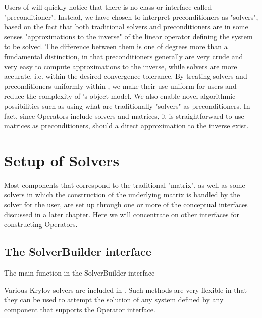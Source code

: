 
Users of \hypre{} will quickly notice that there is
no class or interface called 
"preconditioner". Instead, we have chosen to interpret preconditioners as
"solvers", based on the fact that 
both traditional solvers and preconditioners are in some senses "approximations
to the inverse" of the linear 
operator defining the system to be solved. The difference between them is one
of degrees more than a fundamental distinction, in that 
preconditioners generally are very crude and very easy to compute
approximations to the inverse, while 
solvers are more accurate, i.e. within the desired convergence tolerance. By
treating solvers and 
preconditioners uniformly within \hypre{}, we make their use uniform for users and
reduce the complexity 
of \hypre{}'s object model. We also enable novel algorithmic possibilities such as
using what are 
traditionally "solvers" as preconditioners. In fact, since Operators include
solvers and matrices, it is 
straightforward to use matrices as preconditioners, should a direct
approximation to the inverse exist. 

\section{Setup of Solvers}

Most components that correspond to the traditional "matrix", as well as
some solvers in which the 
construction of the underlying matrix is handled by the solver for the user,
are set up through one or more 
of the conceptual interfaces discussed in a later chapter. Here we will
concentrate on other interfaces for
constructing Operators.

\subsection{The SolverBuilder interface}

The main function in the SolverBuilder interface


Various Krylov solvers are included in \hypre{}.
Such methods are very flexible in that they can be used to attempt
the solution of any system defined by any component that supports the
Operator interface.
